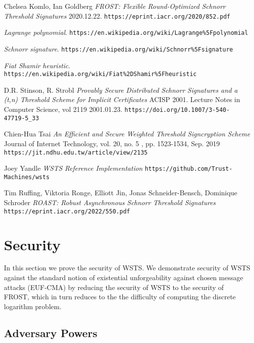 \documentclass{article}
\theoremstyle{definition}
\theoremstyle{remark}
\begin{document}
\begin{thebibliography}{7}

  Chelsea Komlo, Ian Goldberg
  \emph{FROST: Flexible Round-Optimized Schnorr Threshold Signatures} 2020.12.22.
  \texttt{https://eprint.iacr.org/2020/852.pdf}

  \emph{Lagrange polynomial}.
  \texttt{https://en.wikipedia.org/wiki/Lagrange\%5Fpolynomial}

  \emph{Schnorr signature}.
  \texttt{https://en.wikipedia.org/wiki/Schnorr\%5Fsignature}

  \emph{Fiat Shamir heuristic}.
  \texttt{https://en.wikipedia.org/wiki/Fiat\%2DShamir\%5Fheuristic}

  D.R. Stinson, R. Strobl
  \emph{Provably Secure Distributed Schnorr Signatures and a (t,n) Threshold Scheme for Implicit Certificates} ACISP 2001. Lecture Notes in Computer Science, vol 2119 2001.01.23.
  \texttt{https://doi.org/10.1007/3-540-47719-5\_33}

  Chien-Hua Tsai
  \emph{An Efficient and Secure Weighted Threshold Signcryption Scheme} Journal of Internet Technology, vol. 20, no. 5 , pp. 1523-1534, Sep. 2019
  \texttt{https://jit.ndhu.edu.tw/article/view/2135}

  Joey Yandle
  \emph{WSTS Reference Implementation}
  \texttt{https://github.com/Trust-Machines/wsts}

  Tim Ruffing, Viktoria Ronge, Elliott Jin, Jonas Schneider-Bensch, Dominique Schroder
  \emph{ROAST: Robust Asynchronous Schnorr Threshold Signatures} 
  \texttt{https://eprint.iacr.org/2022/550.pdf}

\end{thebibliography}

\appendix
\newpage
\onecolumn

\section{
  Security
}

In this section we prove the security of WSTS. We demonstrate
security of WSTS against the standard notion of existential unforgeability against chosen message attacks (EUF-CMA) by reducing the security of WSTS to the security of FROST, which in turn reduces to the the difficulty of computing the discrete logarithm problem.

\subsection{Adversary Powers}
\end{document}
